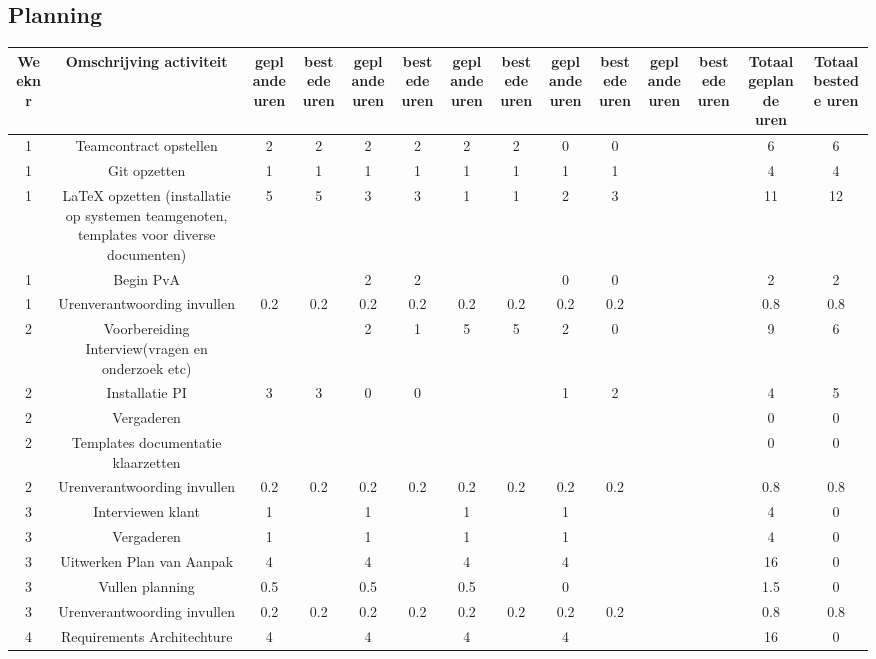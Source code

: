 \subsection{Planning}
\begin{table}
\centering
\begin{tabular}{|c|c|c|c|c|c|c|c|c|c|c|c|c|c|}
\hline
Weeknr & Omschrijving activiteit & geplande
uren & bestede
uren & geplande
uren & bestede
uren & geplande
uren & bestede
uren & geplande
uren & bestede
uren & geplande
uren & bestede
uren & Totaal 
geplande
uren & Totaal
bestede
uren\\ 
\hline
1 & Teamcontract opstellen & 2 & 2 & 2 & 2 & 2 & 2 & 0 & 0 &  &  & 6 & 6\\ 
\hline
1 & Git opzetten & 1 & 1 & 1 & 1 & 1 & 1 & 1 & 1 &  &  & 4 & 4\\ 
\hline
1 & LaTeX opzetten (installatie op systemen teamgenoten, templates voor diverse documenten) & 5 & 5 & 3 & 3 & 1 & 1 & 2 & 3 &  &  & 11 & 12\\ 
\hline
1 & Begin PvA &  &  & 2 & 2 &  &  & 0 & 0 &  &  & 2 & 2\\ 
\hline
1 & Urenverantwoording invullen & 0.2 & 0.2 & 0.2 & 0.2 & 0.2 & 0.2 & 0.2 & 0.2 &  &  & 0.8 & 0.8\\ 
\hline
2 & Voorbereiding Interview(vragen en onderzoek etc) &  &  & 2 & 1 & 5 & 5 & 2 & 0 &  &  & 9 & 6\\ 
\hline
2 & Installatie PI & 3 & 3 & 0 & 0 &  &  & 1 & 2 &  &  & 4 & 5\\ 
\hline
2 & Vergaderen &  &  &  &  &  &  &  &  &  &  & 0 & 0\\ 
\hline
2 & Templates documentatie klaarzetten &  &  &  &  &  &  &  &  &  &  & 0 & 0\\ 
\hline
2 & Urenverantwoording invullen & 0.2 & 0.2 & 0.2 & 0.2 & 0.2 & 0.2 & 0.2 & 0.2 &  &  & 0.8 & 0.8\\ 
\hline
3 & Interviewen klant & 1 &  & 1 &  & 1 &  & 1 &  &  &  & 4 & 0\\ 
\hline
3 & Vergaderen & 1 &  & 1 &  & 1 &  & 1 &  &  &  & 4 & 0\\ 
\hline
3 & Uitwerken Plan van Aanpak & 4 &  & 4 &  & 4 &  & 4 &  &  &  & 16 & 0\\ 
\hline
3 & Vullen planning & 0.5 &  & 0.5 &  & 0.5 &  & 0 &  &  &  & 1.5 & 0\\ 
\hline
3 & Urenverantwoording invullen & 0.2 & 0.2 & 0.2 & 0.2 & 0.2 & 0.2 & 0.2 & 0.2 &  &  & 0.8 & 0.8\\ 
\hline
4 & Requirements Architechture & 4 &  & 4 &  & 4 &  & 4 &  &  &  & 16 & 0\\ 

\end{tabular}
\end{table}
